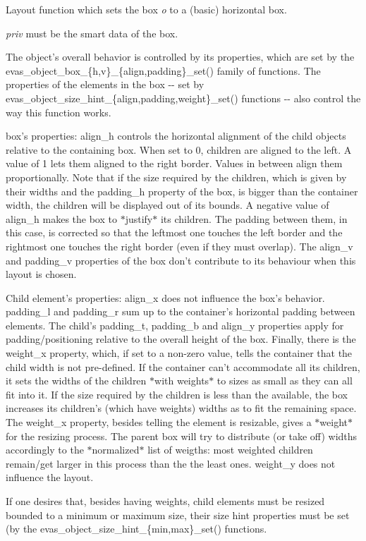 Layout function which sets the box {\itshape o\/} to a (basic) horizontal box. 

{\itshape priv\/} must be the smart data of the box.

The object's overall behavior is controlled by its properties, which are set by the evas\_\-object\_\-box\_\-\{h,v\}\_\-\{align,padding\}\_\-set() family of functions. The properties of the elements in the box -\/-\/ set by evas\_\-object\_\-size\_\-hint\_\-\{align,padding,weight\}\_\-set() functions -\/-\/ also control the way this function works.

\begin{DoxyParagraph}{box's properties:}
{\ttfamily align\_\-h} controls the horizontal alignment of the child objects relative to the containing box. When set to 0, children are aligned to the left. A value of 1 lets them aligned to the right border. Values in between align them proportionally. Note that if the size required by the children, which is given by their widths and the {\ttfamily padding\_\-h} property of the box, is bigger than the container width, the children will be displayed out of its bounds. A negative value of {\ttfamily align\_\-h} makes the box to $\ast$justify$\ast$ its children. The padding between them, in this case, is corrected so that the leftmost one touches the left border and the rightmost one touches the right border (even if they must overlap). The {\ttfamily align\_\-v} and {\ttfamily padding\_\-v} properties of the box don't contribute to its behaviour when this layout is chosen.
\end{DoxyParagraph}
\begin{DoxyParagraph}{Child element's properties:}
{\ttfamily align\_\-x} does not influence the box's behavior. {\ttfamily padding\_\-l} and {\ttfamily padding\_\-r} sum up to the container's horizontal padding between elements. The child's {\ttfamily padding\_\-t}, {\ttfamily padding\_\-b} and {\ttfamily align\_\-y} properties apply for padding/positioning relative to the overall height of the box. Finally, there is the {\ttfamily weight\_\-x} property, which, if set to a non-\/zero value, tells the container that the child width is not pre-\/defined. If the container can't accommodate all its children, it sets the widths of the children $\ast$with weights$\ast$ to sizes as small as they can all fit into it. If the size required by the children is less than the available, the box increases its children's (which have weights) widths as to fit the remaining space. The {\ttfamily weight\_\-x} property, besides telling the element is resizable, gives a $\ast$weight$\ast$ for the resizing process. The parent box will try to distribute (or take off) widths accordingly to the $\ast$normalized$\ast$ list of weigths: most weighted children remain/get larger in this process than the the least ones. {\ttfamily weight\_\-y} does not influence the layout.
\end{DoxyParagraph}
If one desires that, besides having weights, child elements must be resized bounded to a minimum or maximum size, their size hint properties must be set (by the evas\_\-object\_\-size\_\-hint\_\-\{min,max\}\_\-set() functions. 

